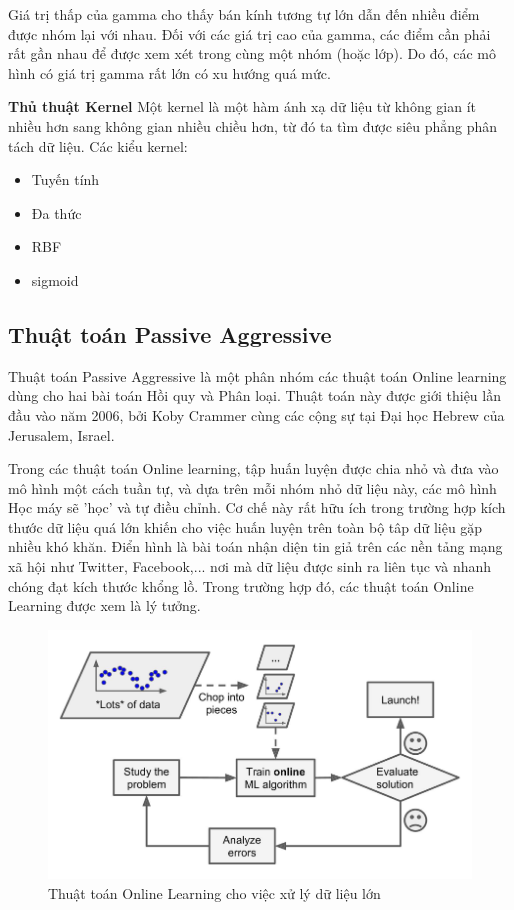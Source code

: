 \documentclass[12pt,a4paper,oneside]{book}
\begin{document}
		Giá trị thấp của gamma cho thấy bán kính tương tự lớn dẫn đến nhiều điểm được nhóm lại với nhau. Đối với các giá trị cao của gamma, các điểm cần phải rất gần nhau để được xem xét trong cùng một nhóm (hoặc lớp). Do đó, các mô hình có giá trị gamma rất lớn có xu hướng quá mức.
		
		\textbf{Thủ thuật Kernel}
		Một kernel là một hàm ánh xạ dữ liệu từ không gian ít nhiều hơn sang không gian nhiều chiều hơn, từ đó ta tìm được siêu phẳng phân tách dữ liệu. Các kiểu kernel:
		\begin{itemize}
			\item Tuyến tính
			\item Đa thức
			\item RBF
			\item sigmoid
		\end{itemize}
		
		
		
		\subsection{Thuật toán Passive Aggressive}
		
		Thuật toán Passive Aggressive là một phân nhóm các thuật toán Online learning dùng cho hai bài toán Hồi quy và Phân loại. Thuật toán này được giới thiệu lần đầu vào năm 2006, bởi Koby Crammer cùng các cộng sự tại Đại học Hebrew của Jerusalem, Israel.
		
		Trong các thuật toán Online learning, tập huấn luyện được chia nhỏ và đưa vào mô hình một cách tuần tự, và dựa trên mỗi nhóm nhỏ dữ liệu này, các mô hình Học máy sẽ 'học' và tự điều chỉnh. Cơ chế này rất hữu ích trong trường hợp kích thước dữ liệu quá lớn khiến cho việc huấn luyện trên toàn bộ tâp dữ liệu gặp nhiều khó khăn. Điển hình là bài toán nhận diện tin giả trên các nền tảng mạng xã hội như Twitter, Facebook,... nơi mà dữ liệu được sinh ra liên tục và nhanh chóng đạt kích thước khổng lồ. Trong trường hợp đó, các thuật toán Online Learning được xem là lý tưởng.
		
		
		\begin{figure}[H]
			\begin{center}
				\includegraphics[width=0.8\columnwidth]{onl_learn}
			\end{center}
			\caption{Thuật toán Online Learning cho việc xử lý dữ liệu lớn}
		\end{figure}
		
\end{document}
